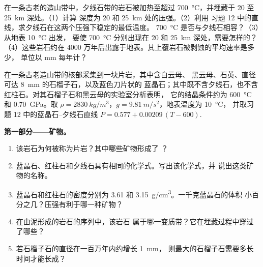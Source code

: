 \begin{exercise}[$\star\star\star$]\label{exo:g12:metamorphic-rocks:15}
在一条古老的造山带中，夕线石带的岩石被加热至超过
\qty{700}{\celsius}，并埋藏于 20 至 \qty{25}{km} 深处。（1）计算
深度为 20 和 \qty{25}{km} 处的压强。（2）利用
习题 12 中的直线，求夕线石在这两个压强下稳定的最低温度。
\qty{700}{\celsius} 是否与夕线石相容？（3）从地表 \qty{10}{\celsius} 出发，
要使 \qty{700}{\celsius} 分别出现在 20 和 \qty{25}{km} 深处，需要怎样的？
（4）这些岩石约在
4000 万年后出露于地表。其上覆岩石被剥蚀的平均速率是多少，
单位以 \unit{mm} 每年计？
\end{exercise}

\begin{problem}
\label{pb:g12:metamorphic-rocks:1}
在一条古老造山带的核部采集到一块片岩，其中含白云母、
黑云母、石英、直径可达 \qty{8}{mm} 的石榴子石，以及蓝色刀片状的
蓝晶石；其中既不含夕线石，也不含红柱石。对其石榴子石和黑云母的实验室分析表明，
它的结晶条件约为
\qty{600}{\celsius} 和 \qty{0.70}{GPa}。取 $\rho =
\qty{2830}{kg/m^3}$，$g = \qty{9.81}{m/s^2}$，地表温度为 \qty{10}{\celsius}，
并取习题 12 中的蓝晶石–夕线石直线 $P = 0.577 +
0.00209\,(T - 600)$.

\medskip
\noindent\textbf{第一部分——矿物。}
\begin{enumerate}
  \item 该岩石为何被称为片岩？其中哪些矿物形成了
        ？
  \item 蓝晶石、红柱石和夕线石具有相同的化学式。写出该化学式，并
        说出这类矿物的名称。
  \item 蓝晶石和红柱石的密度分别为 \num{3.61} 和
        \qty{3.15}{g/cm^3}。一千克蓝晶石的体积
        小百分之几？压强有利于哪一种矿物？
  \item 在由泥形成的岩石的序列中，该岩石
        属于哪一变质带？它在埋藏过程中穿过了哪些？
  \item 若石榴子石的直径在一百万年内约增长 \qty{1}{mm}，
        则最大的石榴子石需要多长时间才能长成？
\end{enumerate}


\end{problem}
